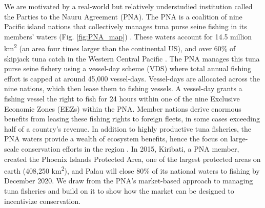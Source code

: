 \documentclass[12pt]{article}
\begin{document}
We are motivated by a real-world but relatively understudied institution called the Parties to the Nauru Agreement (PNA). The PNA is a coalition of nine Pacific island nations that collectively manages tuna purse seine fishing in its members' waters (Fig. \ref{fig:PNA_map}) \cite{havice_2013,aqorau_2018}. These waters account for 14.5 million km\textsuperscript{2} (an area four times larger than the continental US), and over 60\% of skipjack tuna catch in the Western Central Pacific \cite{havice_2013}. The PNA manages this tuna purse seine fishery using a vessel-day scheme (VDS) where total annual fishing effort is capped at around 45,000 vessel-days. Vessel-days are allocated across the nine nations, which then lease them to fishing vessels. A vessel-day grants a fishing vessel the right to fish for 24 hours within one of the nine Exclusive Economic Zones (EEZs) within the PNA. Member nations derive enormous benefits from leasing these fishing rights to foreign fleets, in some cases exceeding half of a country's revenue. In addition to highly productive tuna fisheries, the PNA waters provide a wealth of ecosystem benefits, hence the focus on large-scale conservation efforts in the region \cite{mcleod_2019}. In 2015, Kiribati, a PNA member, created the Phoenix Islands Protected Area, one of the largest protected areas on earth (408,250 km\textsuperscript{2}), and Palau will close 80\% of its national waters to fishing by December 2020. We draw from the PNA's market-based approach to managing tuna fisheries and build on it to show how the market can be designed to incentivize conservation.
\end{document}

